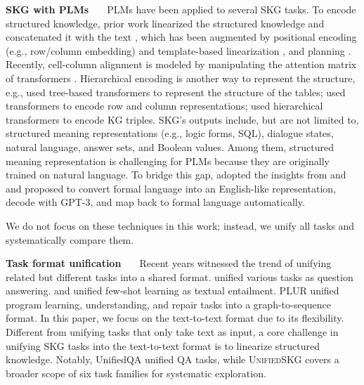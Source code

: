 \textbf{SKG with PLMs \ \ } PLMs have been applied to several SKG tasks. To encode structured knowledge, prior work linearized the structured knowledge and concatenated it with the text \cite{Hwang2019ACE,weijie2019kbert,hosseini2020simple,liu2021tapex}, which has been augmented by positional encoding (e.g., row/column embedding) \cite{Herzig2020tapas,yin20tabert} and template-based linearization \cite{chen2020logical,2019TabFactA,oguz2021unik}, and planning \cite{Su2021PlanthenGenerateCD}. Recently, cell-column alignment is modeled by manipulating the attention matrix of transformers \cite{zhang2020table,eisenschlos2021mate}. Hierarchical encoding is another way to represent the structure, e.g., 
\citet{wang2021tuta} used tree-based transformers to represent the structure of the tables;
\citet{iida2021tabbie} used transformers to encode row and column representations; \citet{chen2020hitter} used hierarchical transformers to encode KG triples. SKG's outputs include, but are not limited to, structured meaning representations (e.g., logic forms, SQL), dialogue states, natural language, answer sets, and Boolean values. Among them, structured meaning representation is challenging for PLMs because they are originally trained on natural language. To bridge this gap, \citet{shin2021constrained} adopted the insights from \citet{berant2014semantic} and \citet{marzoev2020unnatural} and proposed to convert formal language into an English-like representation, decode with GPT-3, and map back to formal language automatically.

We do not focus on these techniques in this work; instead, we unify all tasks and systematically compare them.

\textbf{Task format unification \ \ } Recent years witnessed the trend of unifying related but different tasks into a shared format.
\citet{abs-1806-08730} unified various tasks as question answering. \citet{YinRRSX20} and \citet{abs-2104-14690} unified few-shot learning as textual entailment. PLUR \cite{chen2021plur} unified program learning, understanding, and repair tasks into a graph-to-sequence format. In this paper, we focus on the text-to-text format \cite{2020t5} due to its flexibility. Different from unifying tasks that only take text as input, a core challenge in unifying SKG tasks into the text-to-text format is to linearize structured knowledge. Notably, UnifiedQA \cite{2020unifiedqa} unified QA tasks, while \textsc{Unified}SKG covers a broader scope of six task families for systematic exploration. 

